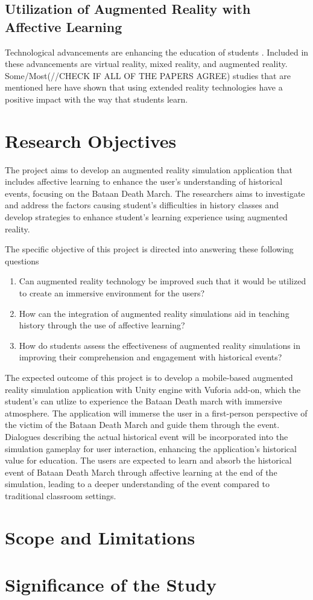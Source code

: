 \subsection{Utilization of Augmented Reality with Affective Learning}
Technological advancements are enhancing the education of students \cite{lamp2024}. Included in these advancements are virtual reality, mixed reality, and augmented reality. Some/Most(//CHECK IF ALL OF THE PAPERS AGREE) studies that are mentioned here have shown that using extended reality technologies have a positive impact with the way that students learn.


\section{Research Objectives}
The project aims to develop an augmented reality simulation application that includes affective learning to enhance the user's understanding of historical events, focusing on the Bataan Death March. The researchers aims to investigate and address the factors causing student's difficulties in history classes and develop strategies to enhance student's learning experience using augmented reality.

The specific objective of this project is directed into answering these following questions
\begin{enumerate}
    \item Can augmented reality technology be improved such that it would be utilized to create an immersive environment for the users?
    \item How can the integration of augmented reality simulations aid in teaching history through the use of affective learning?
    \item How do students assess the effectiveness of augmented reality simulations in improving their comprehension and engagement with historical events? 
\end{enumerate}

The expected outcome of this project is to develop a mobile-based augmented reality simulation application with Unity engine with Vuforia add-on, which the student's can utlize to experience the Bataan Death march with immersive atmosphere. The application will immerse the user in a first-person perspective of the victim of the Bataan Death March and guide them through the event. Dialogues describing the actual historical event will be incorporated into the simulation gameplay for user interaction, enhancing the application's historical value for education. The users are expected to learn and absorb the historical event of Bataan Death March through affective learning at the end of the simulation, leading to a deeper understanding of the event compared to traditional classroom settings.
 
\section{Scope and Limitations}

\section{Significance of the Study}